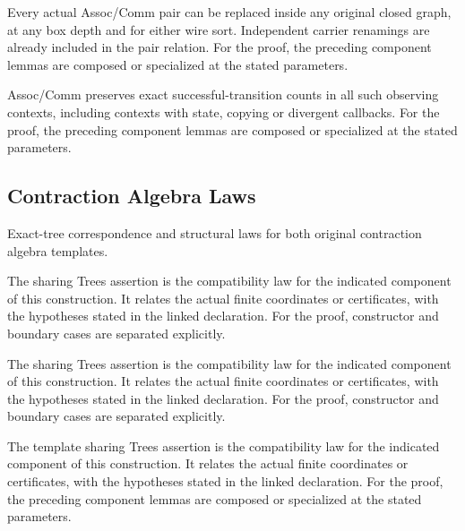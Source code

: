 Every actual Assoc/Comm pair can be replaced inside any original closed graph, at any box depth and for either wire sort. Independent carrier renamings are already included in the pair relation.
For the proof, the preceding component lemmas are composed or specialized at the stated parameters.
\par{}

Assoc/Comm preserves exact successful-transition counts in all such observing contexts, including contexts with state, copying or divergent callbacks.
For the proof, the preceding component lemmas are composed or specialized at the stated parameters.
\par{}

\subsection{Contraction Algebra Laws}
Exact-tree correspondence and structural laws for both original contraction algebra templates.

The sharing Trees assertion is the compatibility law for the indicated component of this construction. It relates the actual finite coordinates or certificates, with the hypotheses stated in the linked declaration.
For the proof, constructor and boundary cases are separated explicitly.
\par{}

The sharing Trees assertion is the compatibility law for the indicated component of this construction. It relates the actual finite coordinates or certificates, with the hypotheses stated in the linked declaration.
For the proof, constructor and boundary cases are separated explicitly.
\par{}

The template sharing Trees assertion is the compatibility law for the indicated component of this construction. It relates the actual finite coordinates or certificates, with the hypotheses stated in the linked declaration.
For the proof, the preceding component lemmas are composed or specialized at the stated parameters.
\par{}

